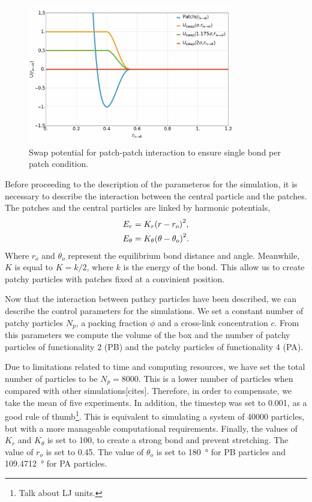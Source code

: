 \begin{figure}[ht!]
    \centering
    \includegraphics[width=0.8\textwidth]{figs/numerical/swapPotential.png}
    \caption{Swap potential for patch-patch interaction to ensure single bond per patch condition.}\label{fig:swappot}
\end{figure}

Before proceeding to the description of the parameteros for the simulation, it is necessary to describe the interaction between the central particle and the patches.
The patches and the central particles are linked by harmonic potentials,
\begin{align}
    E_r &= K_r\qty(r-r_{o})^2, \\
    E_\theta &= K_\theta\qty(\theta-\theta_{o})^2.
\end{align}
Where $r_o$ and $\theta_o$ represent the equilibrium bond distance and angle.
Meanwhile, $K$ is equal to $K=k/2$, where $k$ is the energy of the bond.
This allow us to create patchy particles with patches fixed at a convinient position.

Now that the interaction between pathcy particles have been described, we can describe the control parameters for the simulations.
We set a constant number of patchy particles $N_p$, a packing fraction $\phi$ and a cross-link concentration $c$. 
From this parameters we compute the volume of the box and the number of patchy particles of functionality 2 (PB) and the patchy particles of functionality 4 (PA).

Due to limitations related to time and computing resources, we have set the total number of particles to be $N_p=\num{8000}$.
This is a lower number of particles when compared with other simulations[cites].
Therefore, in order to compensate, we take the mean of five experiments.
In addition, the timestep was set to \num{0.001}, as a good rule of thumb\footnote{Talk about LJ units.}.
This is equivalent to simulating a system of \num{40000} particles, but with a more manageable computational requirements.
Finally, the values of $K_r$ and $K_\theta$ is set to \num{100}, to create a strong bond and prevent stretching.
The value of $r_o$ is set to \num{0.45}.
The value of $\theta_o$ is set to \SI{180}{\degree} for PB particles and \SI{109.4712}{\degree} for PA particles.

